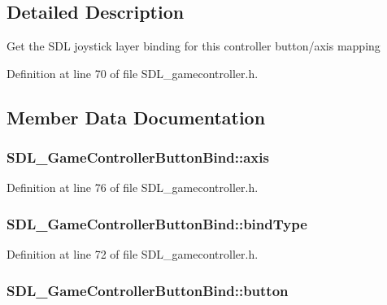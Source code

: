 \subsection{Detailed Description}
Get the S\-D\-L joystick layer binding for this controller button/axis mapping 

Definition at line 70 of file S\-D\-L\-\_\-gamecontroller.\-h.



\subsection{Member Data Documentation}
\hypertarget{struct_s_d_l___game_controller_button_bind_a2ffbc482f5aadcbb8df97d406708f456}{
\subsubsection[{axis}]{ S\-D\-L\-\_\-\-Game\-Controller\-Button\-Bind\-::axis}}\label{struct_s_d_l___game_controller_button_bind_a2ffbc482f5aadcbb8df97d406708f456}


Definition at line 76 of file S\-D\-L\-\_\-gamecontroller.\-h.

\hypertarget{struct_s_d_l___game_controller_button_bind_a032fd941b0e8e5e2cdf52b7597f559b9}{
\subsubsection[{bind\-Type}]{ S\-D\-L\-\_\-\-Game\-Controller\-Button\-Bind\-::bind\-Type}}\label{struct_s_d_l___game_controller_button_bind_a032fd941b0e8e5e2cdf52b7597f559b9}


Definition at line 72 of file S\-D\-L\-\_\-gamecontroller.\-h.

\hypertarget{struct_s_d_l___game_controller_button_bind_a2657029cfc39aa91b5b5342d4a037d95}{
\subsubsection[{button}]{ S\-D\-L\-\_\-\-Game\-Controller\-Button\-Bind\-::button}}\label{struct_s_d_l___game_controller_button_bind_a2657029cfc39aa91b5b5342d4a037d95}


